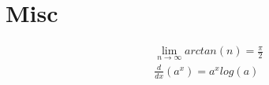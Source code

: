 \documentclass[12 pt]{article}
\theoremstyle{definition}
\begin{document}
\section{Misc}
\begin{align}
	& \lim_{n\to \infty}arctan(n)=\frac{\pi}{2}
	\\&\frac{d}{dx}\left(a^x\right)=a^x log(a)
\end{align}
\end{document}
